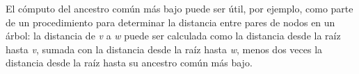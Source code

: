 El cómputo del ancestro común más bajo puede ser útil, por ejemplo, como parte de un procedimiento para determinar la distancia entre pares de nodos en un árbol: la distancia de {\em v} a {\em w} puede ser calculada como la distancia desde la raíz hasta {\em v}, sumada con la distancia desde la raíz hasta {\em w}, menos dos veces la distancia desde la raíz hasta su ancestro común más bajo. 